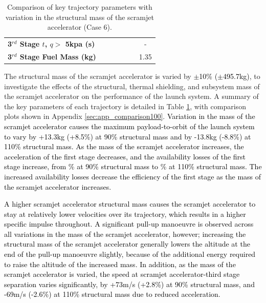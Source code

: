 \begin{table}[ht]
\begin{tabular}{l c c c c c c}
		\\
		\textbf{3$^{rd}$ Stage $t$, $q >$ 5kpa (s)}
		& \thirdqOverFivemSPARTANNinetyNoReturn
		& \thirdqOverFivemSPARTANNinetyFiveNoReturn
		& \thirdqOverFivemSPARTANStandardNoReturn
		& \thirdqOverFivemSPARTANOneHundredFiveNoReturn
		& \thirdqOverFivemSPARTANOneHundredTenNoReturn
		& -
		\\
		\textbf{3$^{rd}$ Stage Fuel Mass (kg)}
		& \thirdmFuelmSPARTANNinetyNoReturn
		& \thirdmFuelmSPARTANNinetyFiveNoReturn
		& \thirdmFuelmSPARTANStandardNoReturn
		& \thirdmFuelmSPARTANOneHundredFiveNoReturn
		& \thirdmFuelmSPARTANOneHundredTenNoReturn
		&1.35
		\\
		\hline 
	\end{tabular} 
\caption{Comparison of key trajectory parameters with variation in the structural mass of the scramjet accelerator (Case 6).}
\label{tab:comparison100}
	
\end{table}


\noindent
The structural mass of the scramjet accelerator is varied by \textcolor{black}{$\pm$10\% ($\pm$495.7kg)}, to investigate the effects of the structural, thermal shielding, and subsystem mass of the scramjet accelerator on the performance of the launch system. A summary of the key parameters of each trajectory is detailed in Table \ref{tab:comparison100}, with comparison plots shown in Appendix \ref{sec:app_comparison100}.
\textcolor{black}{Variation in the mass of the scramjet accelerator causes the maximum payload-to-orbit of the launch system to vary by +13.3kg (+8.5\%) at 90\% structural mass and by -13.8kg (-8.8\%) at 110\% structural mass. 
 As the mass of the scramjet accelerator increases, the acceleration of the first stage decreases, and the availability losses of the first stage increase, from \PlossonemSPARTANNinetyNoReturn\% at 90\% structural mass to \PlossonemSPARTANOneHundredTenNoReturn\% at 110\% structural mass. The increased availability losses decrease the efficiency of the first stage as the mass of the scramjet accelerator increases.}

\textcolor{black}{
A higher scramjet accelerator structural mass causes the scramjet accelerator to stay at relatively lower velocities over its trajectory, which results in a higher specific impulse throughout. 
A significant pull-up manoeuvre is observed across all variations in the mass of the scramjet accelerator, however; increasing the structural mass of the scramjet accelerator generally lowers the altitude at the end of the pull-up manoeuvre slightly, because of the additional energy required to raise the altitude of the increased mass. In addition, as the mass of the scramjet accelerator is varied, the speed at scramjet accelerator-third stage separation varies significantly, by +73m/s (+2.8\%) at 90\% structural mass, and -69m/s (-2.6\%) at 110\% structural mass due to reduced acceleration. }

